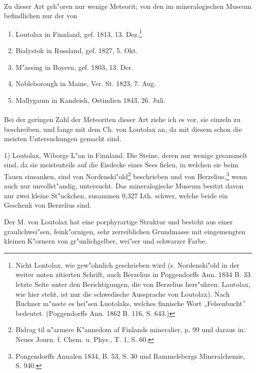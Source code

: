\documentclass[a4paper, 11pt, oneside]{article}
\begin{document}
\paragraph{}
Zu dieser Art geh"oren nur wenige Meteorit; von den im mineralogischen Museum befindlichen nur der von
\begin{enumerate}
    \item Loutolax in Finnland, gef. 1813, 13. Dez.\footnote{Nicht Lontolax, wie gew"ohnlich geschrieben wird (s. Nordenski"old in der weiter unten zitierten Schrift, auch Berzelius in Poggendorffs Ann. 1834 B. 33 letzte Seite unter den Berichtigungen, die von Berzelius herr"uhren. Lautolax, wie hier steht, ist nur die schwedische Aussprache von Loutolax). Nach Buchner m"usste es hei"sen Luotolaks, welches finnische Wort „Felsenbucht” bedeutet. (Poggendorffs Ann. 1862 B. 116, S. 643.)}
    \item Bialystok in Russland, gef. 1827, 5. Okt.
    \item M"assing in Bayern, gef. 1803, 13. Der.
    \item Nobleborough in Maine, Ver. St. 1823, 7. Aug.
    \item Mallygaum in Kandeish, Ostindien 1843, 26. Juli.
\end{enumerate}
\paragraph{}
Bei der geringen Zahl der Meteoriten dieser Art ziehe ich es vor, sie einzeln zu beschreiben, und fange mit dem Ch. von Loutolax an, da mit diesem schon die meisten Untersuchungen gemacht sind.

1) Loutolax, Wiborgs L"an in Finnland. Die Steine, deren nur wenige gesammelt sind, da sie meistenteils auf die Eisdecke eines Sees fielen, in welchen sie beim Tauen einsanken, sind von Nordenski"old\footnote{Bidrag til n"armere K"annedom af Finlands mineralier, p. 99 und daraus in: Neues Journ. f. Chem. u. Phys., T. 1, S. 60.} beschrieben und von Berzelius,\footnote{Pongendorffs Annalen 1834, B. 53, S. 30 und Rammelsbergs Mineralchemie, S. 940.} wenn auch nur unvollst"andig, untersucht. Das mineralogische Museum besitzt davon nur zwei kleine St"uckchen, zusammen 0,327 Lth. schwer, welche beide ein Geschenk von Berzelius sind.

Der M. von Loutolax hat eine porphyrartige Struktur und besteht aus einer graulichwei"sen, feink"ornigen, sehr zerreiblichen Grundmasse mit eingemengten kleinen K"ornern von gr"unlichgelber, wei"ser und schwarzer Farbe.
\end{document}
